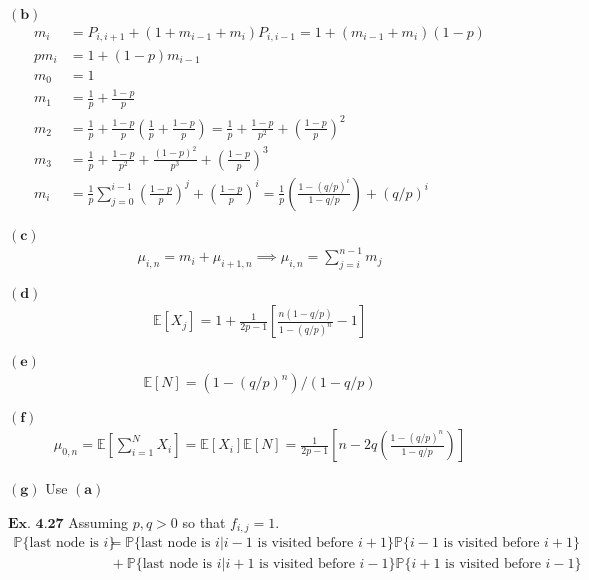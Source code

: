 \documentclass{article}
\begin{document}
$\mathbf{(b)}$
\begin{align*}
m_{i} &= P_{i,i+1} + (1+m_{i-1} + m_{i})P_{i,i-1} = 1 + (m_{i-1}+m_{i})(1-p)\\
pm_{i} &= 1 + (1-p)m_{i-1}\\
m_0 &= 1\\
m_1 &= \frac{1}{p} + \frac{1-p}{p}\\
m_2 &= \frac{1}{p} + \frac{1-p}{p}\left(\frac{1}{p} + \frac{1-p}{p}\right) = \frac{1}{p} + \frac{1-p}{p^2} + \left(\frac{1-p}{p}\right)^2\\
m_3 &= \frac{1}{p} + \frac{1-p}{p^2} + \frac{(1-p)^2}{p^3} + \left(\frac{1-p}{p}\right)^3\\
m_i &= \frac{1}{p}\sum_{j=0}^{i-1}\left(\frac{1-p}{p}\right)^{j} + \left(\frac{1-p}{p}\right)^i = \frac{1}{p}\left(\frac{1-(q/p)^i}{1-q/p}\right) + (q/p)^{i}
\end{align*}

$\mathbf{(c)}$
\begin{align*}
\mu_{i,n} = m_i + \mu_{i+1,n} \implies \mu_{i,n} = \sum_{j=i}^{n-1}m_j
\end{align*}

$\mathbf{(d)}$
\begin{align*}
\mathbb{E}[X_j] = 1+\frac{1}{2p-1}\left[\frac{n(1-q/p)}{1-(q/p)^n} - 1\right]
\end{align*}


$\mathbf{(e)}$
\begin{align*}
\mathbb{E}[N] = (1-(q/p)^n)/(1-q/p)
\end{align*}

$\mathbf{(f)}$
\begin{align*}
\mu_{0,n} = \mathbb{E}\left[\sum_{i=1}^{N}X_i\right] = \mathbb{E}[X_i]\mathbb{E}[N] = \frac{1}{2p-1}\left[n-2q\left(\frac{1-(q/p)^n}{1-q/p}\right)\right]
\end{align*}

$\mathbf{(g)}$
Use $\mathbf{(a)}$

\vspace{0.2in}
${\textbf{Ex. 4.27}}$
Assuming $p,q>0$ so that $f_{i,j}=1$.
\begin{align*}
\mathbb{P}\{\text{last node is }i\} &= \mathbb{P}\{\text{last node is }i|i-1\text{ is visited before }i+1\}\mathbb{P}\{i-1\text{ is visited before }i+1\} \\ &\ + \mathbb{P}\{\text{last node is }i|i+1\text{ is visited before }i-1\}\mathbb{P}\{i+1\text{ is visited before }i-1\}\\
\end{align*}
\end{document}
